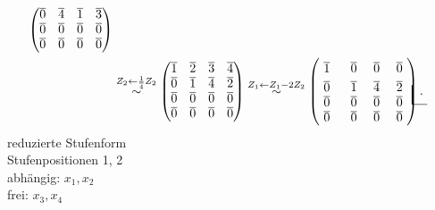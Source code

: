 \documentclass[../../main.tex]{subfiles}
\begin{document}
\begin{bsp}
\begin{align*}
\begin{pmatrix}
\overline{0} & \overline{4} & \overline{1} & \overline{3}\\
\overline{0} & \overline{0} & \overline{0} & \overline{0}\\
\overline{0} & \overline{0} & \overline{0} & \overline{0}
\end{pmatrix}\\
&\overset{Z_2\leftarrow \frac{1}{\overline4}Z_2}{\sim}\begin{pmatrix}
\overline{1} & \overline{2} & \overline{3} & \overline{4}\\
\overline{0} & \overline{1} & \overline{4} & \overline{2}\\
\overline{0} & \overline{0} & \overline{0} & \overline{0}\\
\overline{0} & \overline{0} & \overline{0} & \overline{0}
\end{pmatrix}\overset{Z_1\leftarrow Z_1-2Z_2}{\sim}\begin{pmatrix}
\tikz[baseline=(m1.base)]\node(m1){$\overline{1}$}; & \overline{0} & \overline{0} & \overline{0}\\
\overline{0} & \tikz[baseline=(m2.base)]\node(m2){$\overline{1}$}; & \overline{4} & \tikz[baseline=(m3.base)]\node(m3){$\overline{2}$};\\
\overline{0} & \overline{0} & \overline{0} & \overline{0}\\
\overline{0} & \overline{0} & \overline{0} & \overline{0}
\end{pmatrix}
\begin{tikzpicture}[overlay]
\draw (m1.north west) -- (m1.south west) -- (m2.north west) -- (m2.south west) -- (m3.south east);
\end{tikzpicture}.
\end{align*}
reduzierte Stufenform\\
Stufenpositionen 1, 2\\
abhängig: $x_1, x_2$\\
frei: $x_3,x_4$


\end{bsp}
\end{document}
